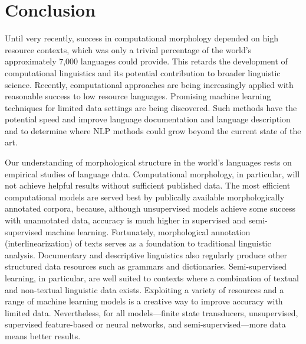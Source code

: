 \documentclass[12pt]{article}
\begin{document}
\section{Conclusion}

Until very recently, success in computational morphology depended on high resource contexts, which was only a trivial percentage of the world’s approximately 7,000 languages could provide. This retards the development of computational linguistics and its potential contribution to broader linguistic science. Recently, computational approaches are being increasingly applied with reasonable success to low resource languages. Promising machine learning techniques for limited data settings are being discovered.  Such methods have the potential speed and improve language documentation and language description and to determine where NLP methods could grow beyond the current state of the art. 

Our understanding of morphological structure in the world's languages rests on empirical studies of language data. Computational morphology, in particular, will not achieve helpful results without sufficient published data. The most efficient computational models are served best by publically available morphologically annotated corpora, because, although unsupervised models achieve some success with unannotated data, accuracy is much higher in supervised and semi-supervised machine learning. Fortunately, morphological annotation (interlinearization) of texts serves as a foundation to traditional linguistic analysis. Documentary and descriptive linguistics also regularly produce other structured data resources such as grammars and dictionaries. Semi-supervised learning, in particular, are well suited to contexts where a combination of textual and non-textual linguistic data exists. Exploiting a variety of resources and a range of machine learning models is a creative way to improve accuracy with limited data. Nevertheless, for all models—finite state transducers, unsupervised, supervised feature-based or neural networks, and semi-supervised—more data means better results. 
\end{document}
